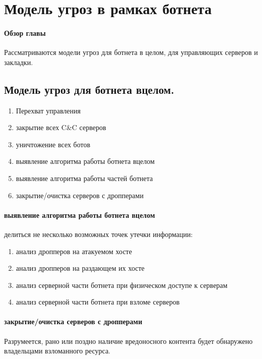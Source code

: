 \section{Модель угроз в рамках ботнета}
\label{botnet_treat_model}

\paragraph{Обзор главы\\}
Рассматриваются модели угроз для ботнета в целом, для управляющих серверов и закладки.

\subsection{Модель угроз для ботнета вцелом.}
\begin{enumerate}
\item{Перехват управления}
\item{закрытие всех C\&C серверов}
\item{уничтожение всех ботов}
\item{выявление алгоритма работы ботнета вцелом}
\item{выявление алгоритма работы частей ботнета}
\item{закрытие/очистка серверов с дропперами}
\end{enumerate}

\paragraph{выявление алгоритма работы ботнета вцелом} делиться не несколько возможных точек утечки информации:
\begin{enumerate}
\item{анализ дропперов на атакуемом хосте}
\item{анализ дропперов на раздающем их хосте}
\item{анализ серверной части ботнета при физическом доступе к серверам}
\item{анализ серверной части ботнета при взломе серверов}
\end{enumerate}

\paragraph{закрытие/очистка серверов с дропперами\\}
Разрумеется, рано или поздно наличие вредоносного контента будет обнаружено владельцами взломанного ресурса.

